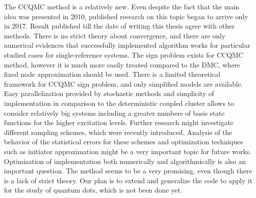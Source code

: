 \documentclass[twoside,english]{uiofysmaster}
\begin{document}
The CCQMC method is a relatively new. Even despite the fact that the main idea was presented in 2010,  published research on this topic began to arrive only in 2017. Result published till the date of writing this thesis agree with other methods.
There is no strict theory about convergence, and there are only numerical evidences that successfully implemented algorithm works for particular studied cases for single-reference systems. The sign problem exists for CCQMC method, however it is much more easily treated compared to the DMC, where fixed node approximation should be used. There is a limited theoretical framework for CCQMC sign problem, and only simplified models are available.
Easy parallelization provided by stochastic methods and simplicity of implementation in comparison to the deterministic coupled cluster allows to consider relatively big systems including a greater numbers of basis state functions for the higher excitation levels.
Further research might investigate different sampling schemes\cite{ScottStochasticcoupledcluster2017}, which were recently introduced. Analysis of the behavior of the statistical errors for these schemes and optimization techniques such as initiator approximation might be a very important topic for future works.
Optimization of implementation both numerically and algorithmically is also an important question.
The method seems to be a very promising, even though there is a lack of strict theory. 
Our plan is to extend and generalize the code to apply it for the study of quantum dots, which is not been done yet.


\appendix
\renewcommand{\thesection}{\Alph{section}.\arabic{section}}
\setcounter{section}{0}
\end{document}
